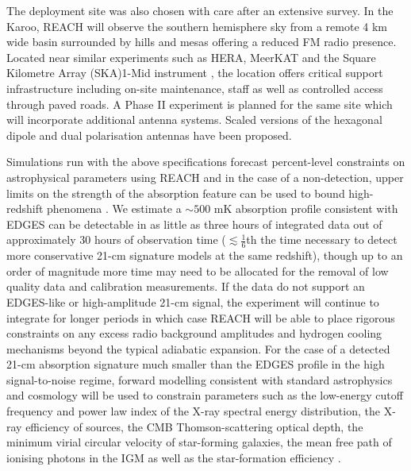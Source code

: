 The deployment site was also chosen with care after an extensive survey. In the Karoo, REACH will observe the southern hemisphere sky from a remote 4 km wide basin surrounded by hills and mesas offering a reduced FM radio presence. Located near similar experiments such as HERA, MeerKAT \citep{meerkat} and the Square Kilometre Array (SKA)1-Mid instrument \citep{ska}, the location offers critical support infrastructure including on-site maintenance, staff as well as controlled access through paved roads. A Phase II experiment is planned for the same site which will incorporate additional antenna systems. Scaled versions of the hexagonal dipole and dual polarisation antennas have been proposed.

Simulations run with the above specifications forecast percent-level constraints on astrophysical parameters using REACH and in the case of a non-detection, upper limits on the strength of the absorption feature can be used to bound high-redshift phenomena \citep{reach}. We estimate a $\sim 500$ mK absorption profile consistent with EDGES can be detectable in as little as three hours of integrated data out of approximately 30 hours of observation time ($\lesssim \frac{1}{6}$th the time necessary to detect more conservative 21-cm signature models at the same redshift), though up to an order of magnitude more time may need to be allocated for the removal of low quality data and calibration measurements. If the data do not support an EDGES-like or high-amplitude 21-cm signal, the experiment will continue to integrate for longer periods in which case REACH will be able to place rigorous constraints on any excess radio background amplitudes and hydrogen cooling mechanisms beyond the typical adiabatic expansion. For the case of a detected 21-cm absorption signature much smaller than the EDGES profile in the high signal-to-noise regime, forward modelling consistent with standard astrophysics and cosmology will be used to constrain parameters such as the low-energy cutoff frequency and power law index of the X-ray spectral energy distribution, the X-ray efficiency of sources, the CMB Thomson-scattering optical depth, the minimum virial circular velocity of star-forming galaxies, the mean free path of ionising photons in the IGM as well as the star-formation efficiency \citep{tom_crh,visbal,fialkov_history}.

